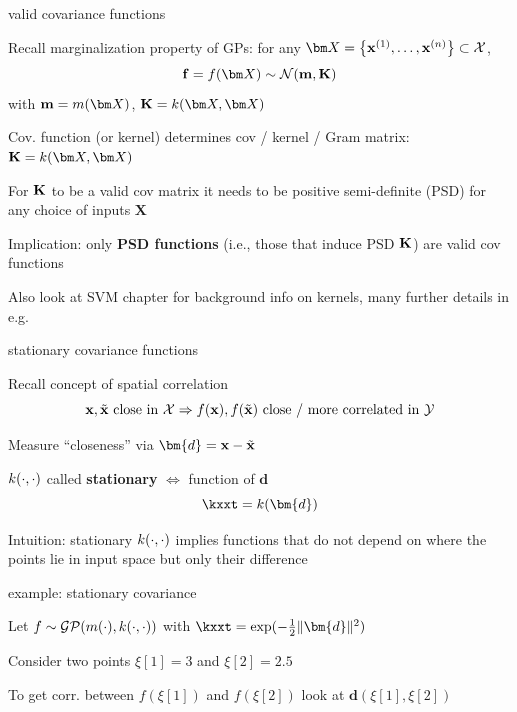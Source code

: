 \documentclass[11pt,compress,t,notes=noshow, xcolor=table]{beamer}
\begin{document}

\begin{framei}[sep=L]{valid covariance functions}
\item Recall marginalization property of GPs: for any $\Xsubset = \xdat \subset \Xspace$,
$$\fv = \fX \sim \Nmk$$
with $\mv = \mX$, $\Kmat = \kXX$
\item Cov. function (or kernel) determines cov / kernel / Gram matrix: $\Kmat = \kXX$
\item For $\mathbf{K}$ to be a valid cov matrix it needs to be positive semi-definite (PSD) for any choice of inputs $\bm{X}$
\item Implication: only \textbf{PSD functions} (i.e., those that induce PSD $\mathbf{K}$) are valid cov functions 

\item Also look at SVM chapter for background info on kernels, 
many further details in e.g. 

\end{framei}

\begin{framei}[sep=L]{stationary covariance functions}
\item Recall concept of spatial correlation
$$\mathbf{x}, \tilde{\mathbf{x}} \text{ close in } \mathcal{X} \Rightarrow f(\mathbf{x}), f(\tilde{\mathbf{x}}) \text{ close / more correlated in } \mathcal{Y}$$
\item Measure ``closeness'' via $\bm{d} = \xv - \xtil$ 
\item $k(\cdot, \cdot)$ called \textbf{stationary} $\Leftrightarrow$ function of $\bm{d}$ 
$$\kxxt = k(\bm{d})$$
\item Intuition: stationary $k(\cdot, \cdot)$ implies functions that do not depend on where the points lie in input space but only their difference 

\end{framei}

\begin{framei}{example: stationary covariance} 
\item Let $f \sim \mathcal{GP}(m(\cdot), k(\cdot, \cdot))$ with $\kxxt = \exp(-\tfrac{1}{2}\|\bm{d}\|^2)$ 
\item Consider two points $\xi[1] = 3$ and $\xi[2] = 2.5$ 
\item To get corr. between $f(\xi[1])$ and $f(\xi[2])$ look at $\bm{d}(\xi[1], \xi[2])$ 
\vfill 
{} 
\end{framei} 
\end{document}
